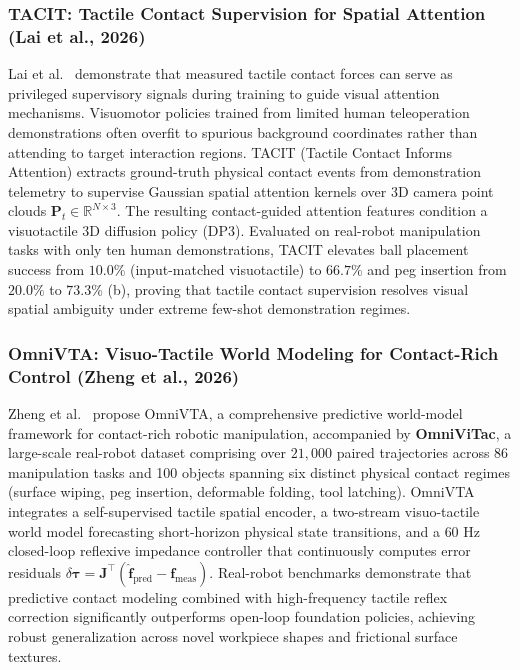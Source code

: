 \subsubsection{TACIT: Tactile Contact Supervision for Spatial Attention (Lai et al., 2026)}
Lai et al.~\cite{Lai2026TACIT} demonstrate that measured tactile contact forces can serve as privileged supervisory signals during training to guide visual attention mechanisms. Visuomotor policies trained from limited human teleoperation demonstrations often overfit to spurious background coordinates rather than attending to target interaction regions. TACIT (Tactile Contact Informs Attention) extracts ground-truth physical contact events from demonstration telemetry to supervise Gaussian spatial attention kernels over 3D camera point clouds $\mathbf{P}_t \in \mathbb{R}^{N \times 3}$. The resulting contact-guided attention features condition a visuotactile 3D diffusion policy (DP3). Evaluated on real-robot manipulation tasks with only ten human demonstrations, TACIT elevates ball placement success from $10.0\%$ (input-matched visuotactile) to $66.7\%$ and peg insertion from $20.0\%$ to $73.3\%$ (b), proving that tactile contact supervision resolves visual spatial ambiguity under extreme few-shot demonstration regimes.

\subsubsection{OmniVTA: Visuo-Tactile World Modeling for Contact-Rich Control (Zheng et al., 2026)}
Zheng et al.~\cite{Zheng2026OmniVTA} propose OmniVTA, a comprehensive predictive world-model framework for contact-rich robotic manipulation, accompanied by \textbf{OmniViTac}, a large-scale real-robot dataset comprising over $21{,}000$ paired trajectories across 86 manipulation tasks and 100 objects spanning six distinct physical contact regimes (surface wiping, peg insertion, deformable folding, tool latching). OmniVTA integrates a self-supervised tactile spatial encoder, a two-stream visuo-tactile world model forecasting short-horizon physical state transitions, and a $60\text{ Hz}$ closed-loop reflexive impedance controller that continuously computes error residuals $\delta \boldsymbol{\tau} = \mathbf{J}^\top (\hat{\mathbf{f}}_{\text{pred}} - \mathbf{f}_{\text{meas}})$. Real-robot benchmarks demonstrate that predictive contact modeling combined with high-frequency tactile reflex correction significantly outperforms open-loop foundation policies, achieving robust generalization across novel workpiece shapes and frictional surface textures.


